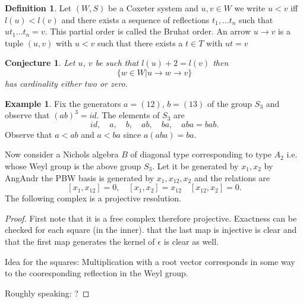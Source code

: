\documentclass{amsart}
\newtheorem*{conjecture}{Conjecture}
\theoremstyle{definition}
\newtheorem{definition}{Definition}
\newtheorem{example}{Example}
\begin{document}
\begin{definition}
	Let $(W,S)$ be a Coxeter system and $u,v\in W$ we write
	$u < v$ iff $l(u) < l(v)$ and there exists a sequence of reflections $t_1,\dotsc t_n$ such that
	$u t_1\dotsc t_n =v$. This partial order is called the Bruhat order.
	An arrow $u\rightarrow v$ is a tuple $(u,v)$ with $u<v$ such that there exists a $t\in T$ with $ut=v$
\end{definition}

\begin{conjecture}
	Let $u$, $v$ be such that $l(u)+2 = l(v)$ then 
	$$ \{ w\in W | u\rightarrow w \rightarrow v \} $$ has cardinality either two or zero.
\end{conjecture}


\begin{example}
	Fix the generators $a= (12)$, $b=(13)$ of the group $S_3$ and observe that 
	$(ab)^3=id$.
	The elements of $S_3$ are
	$$
		id, \quad a, \quad b, \quad ab, \quad ba, \quad aba=bab.
	$$
	Observe that $a < ab$ and $a< ba$ since $a(aba) = ba$.
	\begin{center}
	\end{center}
\end{example}	

Now consider a Nichols algebra $B$ of diagonal type corresponding to type $A_2$ i.e. whose Weyl group is the above group $S_3$.
Let it be generated by $x_1, x_2$ by AngAndr the PBW basis is generated by $x_1, x_{12}, x_2$ and the relations are
$$
	[x_1,x_{12}]= 0, \quad
	[x_1,x_2] = x_{12} \quad
	[x_{12},x_2]= 0.
$$
The following complex is a projective resolution.
\begin{center}
\end{center}
\begin{proof}
	First note that it is a free complex therefore projective.
	Exactness can be checked for each square (in the inner). that the last map is injective is clear and that the first map generates the kernel of $\epsilon$ is clear as well.
	
	Idea for the squares:  Multiplication with a root vector corresponds in some way to the cooresponding reflection in the Weyl group.

 	Roughly speaking:  ?
	
\end{proof}
\end{document}
